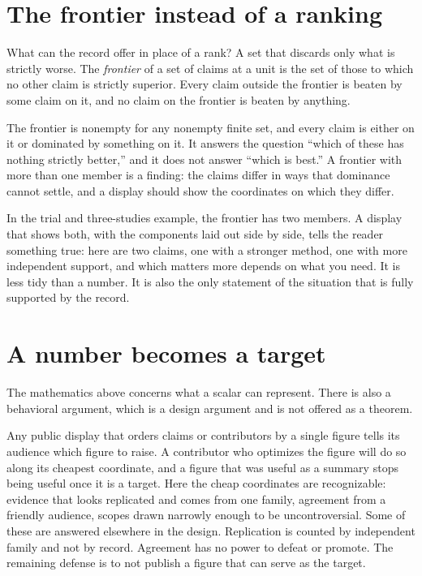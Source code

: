 \documentclass[11pt]{article}
\begin{document}
\section{The frontier instead of a ranking}\label{sec:frontier}

What can the record offer in place of a rank? A set that discards only what is strictly worse. The \emph{frontier} of a set of claims at a unit is the set of those to which no other claim is strictly superior. Every claim outside the frontier is beaten by some claim on it, and no claim on the frontier is beaten by anything.

The frontier is nonempty for any nonempty finite set, and every claim is either on it or dominated by something on it. It answers the question ``which of these has nothing strictly better,'' and it does not answer ``which is best.'' A frontier with more than one member is a finding: the claims differ in ways that dominance cannot settle, and a display should show the coordinates on which they differ.

In the trial and three-studies example, the frontier has two members. A display that shows both, with the components laid out side by side, tells the reader something true: here are two claims, one with a stronger method, one with more independent support, and which matters more depends on what you need. It is less tidy than a number. It is also the only statement of the situation that is fully supported by the record.

\section{A number becomes a target}\label{sec:target}

The mathematics above concerns what a scalar can represent. There is also a behavioral argument, which is a design argument and is not offered as a theorem.

Any public display that orders claims or contributors by a single figure tells its audience which figure to raise. A contributor who optimizes the figure will do so along its cheapest coordinate, and a figure that was useful as a summary stops being useful once it is a target. Here the cheap coordinates are recognizable: evidence that looks replicated and comes from one family, agreement from a friendly audience, scopes drawn narrowly enough to be uncontroversial. Some of these are answered elsewhere in the design. Replication is counted by independent family and not by record. Agreement has no power to defeat or promote. The remaining defense is to not publish a figure that can serve as the target.
\end{document}
